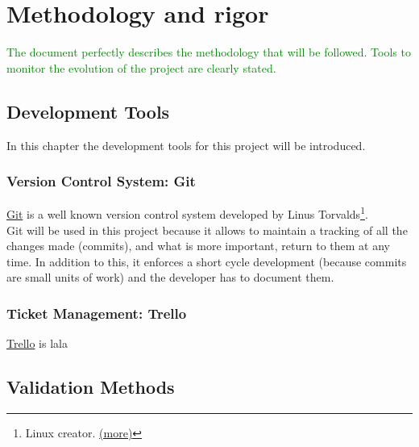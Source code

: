 
\chapter{Methodology and rigor} %

\label{Chapter4} %

\textcolor{green}{The document perfectly describes
	the methodology that will be
	followed. Tools to monitor the
	evolution of the project are clearly
	stated.}

%
%
%
\section{Development Tools}

In this chapter the development tools for this project will be introduced. 

\subsection{Version Control System: Git}

\href{https://git-scm.com/}{Git} is a well known version control system developed by Linus Torvalds\footnote{Linux creator. \href{https://en.wikipedia.org/wiki/Linus_Torvalds}{(more)}}.\\
Git will be used in this project because it allows to maintain a tracking of all the changes made (commits), and what is more important, return to them at any time. In addition to this, it enforces a short cycle development (because commits are small units of work) and the developer has to document them.

\subsection{Ticket Management: Trello}

\href{https://trello.com}{Trello} is lala

%
%
%

\section{Validation Methods}
